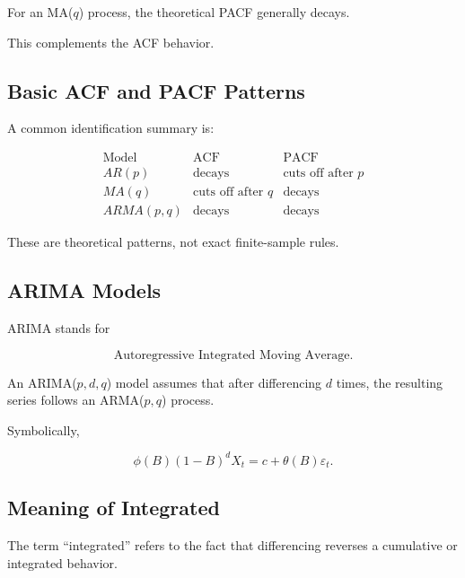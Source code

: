 For an MA(\(q\)) process, the theoretical PACF generally decays.

This complements the ACF behavior.

\subsection{Basic ACF and PACF Patterns}
\label{subsec:acf-pacf-patterns}

A common identification summary is:

\[
\begin{array}{c|c|c}
\text{Model}
&
\text{ACF}
&
\text{PACF}
\\
\hline
AR(p)
&
\text{decays}
&
\text{cuts off after }p
\\
MA(q)
&
\text{cuts off after }q
&
\text{decays}
\\
ARMA(p,q)
&
\text{decays}
&
\text{decays}
\end{array}
\]

These are theoretical patterns, not exact finite-sample rules.

\subsection{ARIMA Models}
\label{subsec:arima-models}

ARIMA stands for

\[
\boxed{
\text{Autoregressive Integrated Moving Average}.
}
\]

An ARIMA(\(p,d,q\)) model assumes that after differencing \(d\) times,
the resulting series follows an ARMA(\(p,q\)) process.

Symbolically,

\[
\boxed{
\phi(B)
(
1-B
)^d
X_t
=
c
+
\theta(B)\varepsilon_t.
}
\]

\subsection{Meaning of Integrated}
\label{subsec:meaning-of-integrated-arima}

The term ``integrated'' refers to the fact that differencing reverses a
cumulative or integrated behavior.

